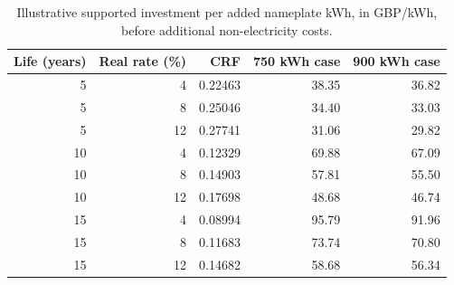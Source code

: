 \begin{table}[htbp]
\centering\small
\caption{Illustrative supported investment per added nameplate kWh, in GBP/kWh, before additional non-electricity costs.}\label{tab:financial-range}
\begin{tabular}{@{}rrrrr@{}}\toprule
Life (years) & Real rate (\%) & CRF & 750 kWh case & 900 kWh case \\\midrule
5 & 4 & 0.22463 & 38.35 & 36.82 \\
5 & 8 & 0.25046 & 34.40 & 33.03 \\
5 & 12 & 0.27741 & 31.06 & 29.82 \\
10 & 4 & 0.12329 & 69.88 & 67.09 \\
10 & 8 & 0.14903 & 57.81 & 55.50 \\
10 & 12 & 0.17698 & 48.68 & 46.74 \\
15 & 4 & 0.08994 & 95.79 & 91.96 \\
15 & 8 & 0.11683 & 73.74 & 70.80 \\
15 & 12 & 0.14682 & 58.68 & 56.34 \\
\bottomrule\end{tabular}
\end{table}
